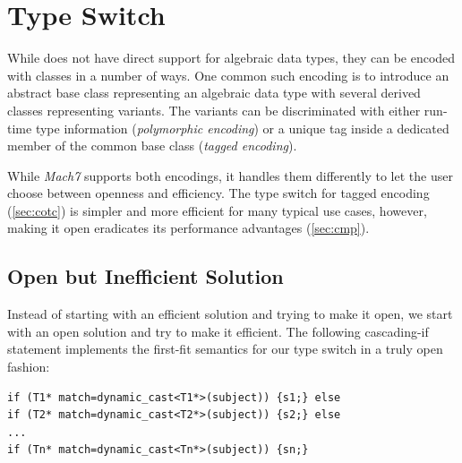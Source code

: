 \section{Type Switch}
\label{sec:copc}

While \Cpp{} does not have direct support for algebraic data types, they can be 
encoded with classes in a number of ways. One common such encoding is to 
introduce an abstract base class representing an algebraic data type with 
several derived classes representing variants. The variants can be 
discriminated with either run-time type information (\emph{polymorphic 
encoding}) or a unique tag inside a dedicated member of the common base class 
(\emph{tagged encoding}).

While \emph{Mach7} supports both encodings, it handles them differently to let 
the user choose between openness and efficiency. The type switch for tagged 
encoding (\textsection\ref{sec:cotc}) is simpler and more efficient for many typical use cases, however, 
making it open eradicates its performance advantages (\textsection\ref{sec:cmp}). 




\subsection{Open but Inefficient Solution}
\label{sec:poets}

Instead of starting with an efficient solution and trying to make it open, we 
start with an open solution and try to make it efficient. The following 
cascading-if statement implements the first-fit semantics for our type switch in 
a truly open fashion:

\begin{lstlisting}
if (T1* match=dynamic_cast<T1*>(subject)) {s1;} else
if (T2* match=dynamic_cast<T2*>(subject)) {s2;} else
...
if (Tn* match=dynamic_cast<Tn*>(subject)) {sn;}
\end{lstlisting}

